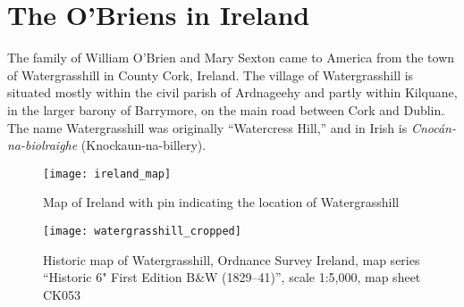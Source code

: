\chapter{The O'Briens in Ireland}

The family of William O'Brien and Mary Sexton came to America from the town of Watergrasshill in County Cork, Ireland.\citep{Edward2OBrienNaturalization,Michael2OBrienNaturalization,Margaret3DooleyBaptism} The village of Watergrasshill is situated mostly within the civil parish of Ardnageehy and partly within Kilquane, in the larger barony of Barrymore, on the main road between Cork and Dublin.\citep{TopographicalDictionary} The name Watergrasshill was originally ``Watercress Hill,'' and in Irish is \textit{Cnoc\'{a}n-na-biolraighe} (Knockaun-na-billery).\citep{LocalNames}

\begin{figure}
	\centering
	\texttt{[image: ireland\_map]}
	\caption{Map of Ireland with pin indicating the location of Watergrasshill}
\end{figure}

\begin{figure}
	\centering
	\texttt{[image: watergrasshill\_cropped]}
	\caption{Historic map of Watergrasshill, Ordnance Survey Ireland, map series ``Historic 6" First Edition B\&W (1829--41)'', scale 1:5,000, map sheet CK053}
\end{figure}

